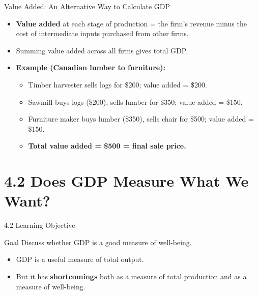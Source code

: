 \documentclass[aspectratio=169]{beamer}
\begin{document}
\begin{frame}{Value Added: An Alternative Way to Calculate GDP}
\transfade
\begin{itemize}
  \item \textbf{Value added} at each stage of production = the firm's revenue minus the cost of intermediate inputs purchased from other firms.
  \item Summing value added across all firms gives total GDP.
  \item \textbf{Example (Canadian lumber to furniture):}
  \begin{itemize}
    \item Timber harvester sells logs for \$200; value added = \$200.
    \item Sawmill buys logs (\$200), sells lumber for \$350; value added = \$150.
    \item Furniture maker buys lumber (\$350), sells chair for \$500; value added = \$150.
    \item \textbf{Total value added = \$500 = final sale price.}
  \end{itemize}
\end{itemize}
\end{frame}

\section{4.2 Does GDP Measure What We Want?}

\begin{frame}{4.2 Learning Objective}
\transfade
\begin{block}{Goal}
Discuss whether GDP is a good measure of well-being.
\end{block}
\begin{itemize}
  \item GDP is a useful measure of total output.
  \item But it has \textbf{shortcomings} both as a measure of total production and as a measure of well-being.
\end{itemize}
\end{frame}
\end{document}
